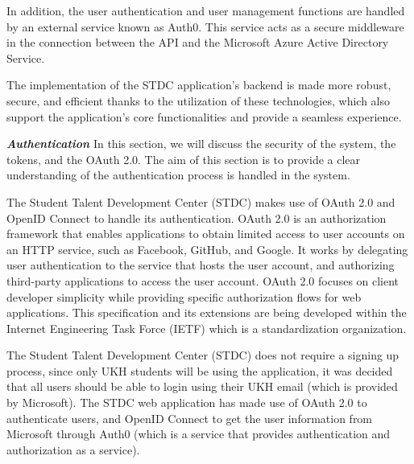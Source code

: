 \begin{justify}
    \vspace{0.25cm}
    \newendline In addition, the user authentication and user management functions are handled by an external service known as Auth0. This service acts as a secure middleware in the connection between the API and the Microsoft Azure Active Directory Service.

    \vspace{0.25cm}
    \newendline The implementation of the STDC application's backend is made more robust, secure, and efficient thanks to the utilization of these technologies, which also support the application's core functionalities and provide a seamless experience.
    \clearpage



    \vspace{0.25cm}
    \newendline \textbf{\textit{Authentication}}\newendline
        In this section, we will discuss the security of the system, the tokens, and the OAuth 2.0. The aim of this section is to provide a clear understanding of the authentication process is handled in the system.
    
        \vspace{0.25cm}
        \newendline The Student Talent Development Center (STDC) makes use of OAuth 2.0 and OpenID Connect to handle its authentication. OAuth 2.0 is an authorization framework that enables applications to obtain limited access to user accounts on an HTTP service, such as Facebook, GitHub, and Google. It works by delegating user authentication to the service that hosts the user account, and authorizing third-party applications to access the user account. OAuth 2.0 focuses on client developer simplicity while providing specific authorization flows for web applications. This specification and its extensions are being developed within the Internet Engineering Task Force (IETF) which is a standardization organization.
    
        \vspace{0.25cm}
        \newendline The Student Talent Development Center (STDC) does not require a signing up process, since only UKH students will be using the application, it was decided that all users should be able to login using their UKH email (which is provided by Microsoft). The STDC web application has made use of OAuth 2.0 to authenticate users, and OpenID Connect to get the user information from Microsoft through Auth0 (which is a service that provides authentication and authorization as a service).
    

\end{justify}
